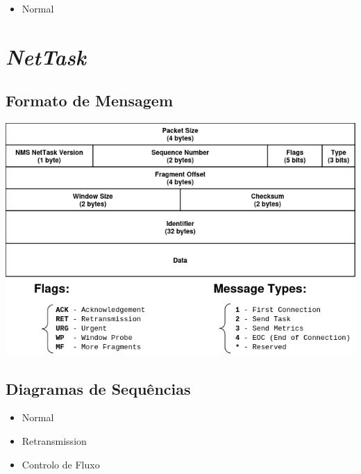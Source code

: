 \documentclass[a4paper,12pt]{scrreprt}
\begin{document}
\begin{itemize}
    \item Normal
\end{itemize}

\section{\textit{NetTask}}

\subsection{Formato de Mensagem}

\begin{minipage}{\textwidth}
    \centering
    \includegraphics[width=\textwidth]{img/nettask_header.png}
    \label{fig:nettask_message_format}
\end{minipage}

\subsection{Diagramas de Sequências}

\begin{itemize}
    \item Normal
    \item Retransmission
    \item Controlo de Fluxo
\end{itemize}

\end{document}
